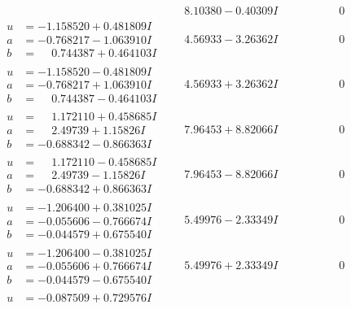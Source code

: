 \documentclass[1p]{elsarticle_modified}
\theoremstyle{definition}
\begin{document}
$$\begin{array}{c|c|c}
 & \phantom{-}8.10380 - 0.40309 I & \phantom{-0.000000 } 0 \\ \hline\begin{aligned}
u &= -1.158520 + 0.481809 I \\
a &= -0.768217 - 1.063910 I \\
b &= \phantom{-}0.744387 + 0.464103 I\end{aligned}
 & \phantom{-}4.56933 - 3.26362 I & \phantom{-0.000000 } 0 \\ \hline\begin{aligned}
u &= -1.158520 - 0.481809 I \\
a &= -0.768217 + 1.063910 I \\
b &= \phantom{-}0.744387 - 0.464103 I\end{aligned}
 & \phantom{-}4.56933 + 3.26362 I & \phantom{-0.000000 } 0 \\ \hline\begin{aligned}
u &= \phantom{-}1.172110 + 0.458685 I \\
a &= \phantom{-}2.49739 + 1.15826 I \\
b &= -0.688342 - 0.866363 I\end{aligned}
 & \phantom{-}7.96453 + 8.82066 I & \phantom{-0.000000 } 0 \\ \hline\begin{aligned}
u &= \phantom{-}1.172110 - 0.458685 I \\
a &= \phantom{-}2.49739 - 1.15826 I \\
b &= -0.688342 + 0.866363 I\end{aligned}
 & \phantom{-}7.96453 - 8.82066 I & \phantom{-0.000000 } 0 \\ \hline\begin{aligned}
u &= -1.206400 + 0.381025 I \\
a &= -0.055606 - 0.766674 I \\
b &= -0.044579 + 0.675540 I\end{aligned}
 & \phantom{-}5.49976 - 2.33349 I & \phantom{-0.000000 } 0 \\ \hline\begin{aligned}
u &= -1.206400 - 0.381025 I \\
a &= -0.055606 + 0.766674 I \\
b &= -0.044579 - 0.675540 I\end{aligned}
 & \phantom{-}5.49976 + 2.33349 I & \phantom{-0.000000 } 0 \\ \hline\begin{aligned}
u &= -0.087509 + 0.729576 I \\

\end{aligned}
\end{array}$$
\end{document}
